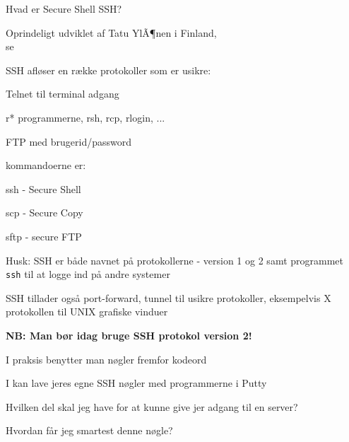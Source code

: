 \documentclass[Screen16to9,17pt]{foils}
\begin{document}



\begin{list1}
\item Hvad er Secure Shell SSH?
\item Oprindeligt udviklet af Tatu YlÃ¶nen i Finland,\\
se 
\item SSH afløser en række protokoller som er usikre:
  \begin{list2}
  \item Telnet til terminal adgang
  \item r* programmerne, rsh, rcp, rlogin, ...
  \item FTP med brugerid/password
  \end{list2}
\end{list1}


\begin{list1}
\item kommandoerne er:
\begin{list2}
  \item ssh - Secure Shell
  \item scp - Secure Copy
  \item sftp - secure FTP
  \end{list2}
\item Husk: SSH er både navnet på protokollerne - version 1 og 2 samt
  programmet \verb+ssh+ til at logge ind på andre systemer
\item SSH tillader også port-forward, tunnel til usikre protokoller,
  eksempelvis X protokollen til UNIX grafiske vinduer
\item {\bfseries NB: Man bør idag bruge SSH protokol version 2!}
\end{list1}



I praksis benytter man nøgler fremfor kodeord
\begin{list1}
\item I kan lave jeres egne SSH nøgler med programmerne i Putty
\item Hvilken del skal jeg have for at kunne give jer adgang til en
  server?
\item Hvordan får jeg smartest denne nøgle?
\end{list1}
\end{document}
